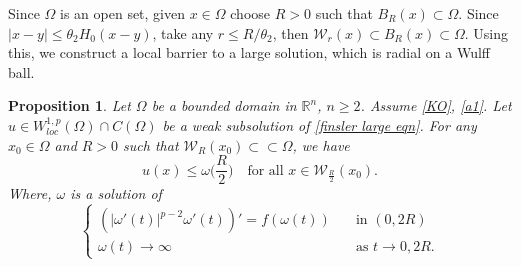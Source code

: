 \documentclass[11pt]{amsart}
\newtheorem{proposition}[theorem]{Proposition}
\newcommand{\rn}{\mathbb{R}^{n}}
\numberwithin{equation}{section}
\begin{document}
Since $\Omega$ is an open set, given $x\in \Omega$ choose $R>0$ such that $B_{R}(x)\subset \Omega$. Since $|x-y|\leq \theta_{2}H_{0}(x-y)$, take any $r\leq R/\theta_{2}$, then $\mathcal{W}_{r}(x)\subset B_{R}(x)\subset\Omega$. Using this, we construct a local barrier to a large solution, which is radial on a Wulff ball.  
  \begin{proposition}\label{prop_weak_local_bound}
    Let $\Omega$ be a bounded domain in $\rn$, $n\geq 2$. Assume \ref{KO}, \ref{a1}. Let $u\in W_{loc}^{1,p}(\Omega)\cap C(\Omega)$ be a weak subsolution of \eqref{finsler large eqn}. For any $x_{0}\in \Omega$ and $R>0$ such that $\mathcal{W}_{R}(x_{0})\subset \subset \Omega$, we have
    \begin{equation}\label{eqn_local_bound}
        u(x)\leq \omega\Big(\frac{R}{2}\Big) \quad \text{for all } x\in \mathcal{W}_{\frac{R}{2}}(x_{0}).
    \end{equation}
    Where, $\omega$ is a solution of
     \begin{equation}\label{eqn omega is a large solution}
        \begin{cases}
            \left(|\omega'(t)|^{p-2}\omega'(t)\right)'=f(\omega(t)) \quad &\text{in } (0,2R)\\
            \omega(t)\to\infty \quad &\text{as } t\to 0, 2R.
        \end{cases}
    \end{equation}
\end{proposition}
\end{document}
